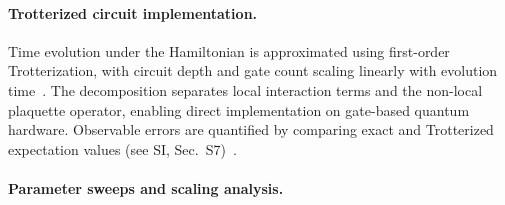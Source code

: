 \documentclass[twocolumn,10pt]{article}
\begin{document}



\paragraph*{Trotterized circuit implementation.}

Time evolution under the Hamiltonian is approximated using first-order Trotterization, with circuit depth and gate count scaling linearly with evolution time~\cite{Trotter1959,Suzuki1990,Lloyd1996,Childs2019}. The decomposition separates local interaction terms and the non-local plaquette operator, enabling direct implementation on gate-based quantum hardware. Observable errors are quantified by comparing exact and Trotterized expectation values (see SI, Sec.~S7)~\cite{BerryAhokasCleveSanders2007}.

\paragraph*{Parameter sweeps and scaling analysis.}
\end{document}
